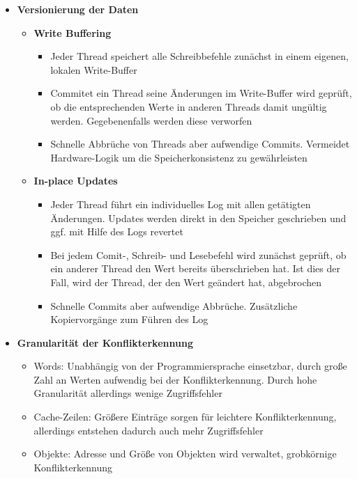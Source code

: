 \begin{itemize}
\begin{itemize}
	\end{itemize}
	\item \textbf{Versionierung der Daten}
	\begin{itemize}
		\item \textbf{Write Buffering}
		\begin{itemize}
			\item Jeder Thread speichert alle Schreibbefehle zunächst in einem eigenen, lokalen Write-Buffer
			\item Commitet ein Thread seine Änderungen im Write-Buffer wird geprüft, ob die entsprechenden Werte in anderen Threads damit ungültig werden. Gegebenenfalls werden diese verworfen %
			\item Schnelle Abbrüche von Threads aber aufwendige Commits. Vermeidet Hardware-Logik um die Speicherkonsistenz zu gewährleisten
		\end{itemize}
		\item \textbf{In-place Updates}
		\begin{itemize}
			\item Jeder Thread führt ein individuelles Log mit allen getätigten Änderungen. Updates werden direkt in den Speicher geschrieben und ggf. mit Hilfe des Logs revertet
			\item Bei jedem Comit-, Schreib- und Lesebefehl wird zunächst geprüft, ob ein anderer Thread den Wert bereits überschrieben hat. Ist dies der Fall, wird der Thread, der den Wert geändert hat, abgebrochen
			\item Schnelle Commits aber aufwendige Abbrüche. Zusätzliche Kopiervorgänge zum Führen des Log
		\end{itemize}
	\end{itemize}
	\item \textbf{Granularität der Konflikterkennung}
	\begin{itemize}
		\item Words: Unabhängig von der Programmiersprache einsetzbar, durch große Zahl an Werten aufwendig bei der Konflikterkennung. Durch hohe Granularität allerdings wenige Zugriffsfehler
		\item Cache-Zeilen: Größere Einträge sorgen für leichtere Konflikterkennung, allerdings entstehen dadurch auch mehr Zugriffsfehler
		\item Objekte: Adresse und Größe von Objekten wird verwaltet, grobkörnige Konflikterkennung
	\end{itemize}
\end{itemize}


